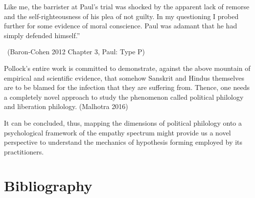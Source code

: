 \begin{myquote}
Like me, the barrister at Paul’s trial was shocked by the apparent lack of remorse and the self-righteousness of his plea of not guilty. In my questioning I probed further for some evidence of moral conscience. Paul was adamant that he had simply defended himself.” 

~\hfill (Baron-Cohen 2012 Chapter 3, Paul: Type P)
\end{myquote}

Pollock's entire work is committed to demonstrate, against the above mountain of empirical and scientific evidence, that somehow Sanskrit and Hindus themselves are to be blamed for the infection that they are suffering from. Thence, one needs a completely novel approach to study the phenomenon called political philology and liberation philology. (Malhotra 2016)

It can be concluded, thus, mapping the dimensions of political philology onto a psychological framework of the empathy spectrum might provide us a novel perspective to understand the mechanics of hypothesis forming employed by its practitioners.


\section*{Bibliography}

